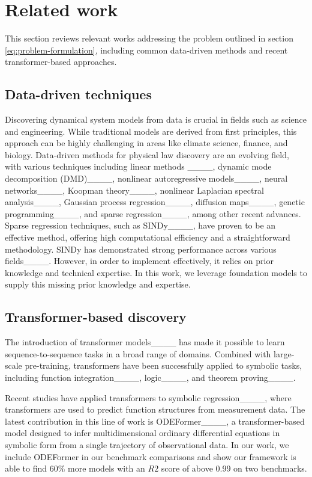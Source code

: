 \section{Related work}
This section reviews relevant works addressing the problem outlined in section \ref{eq:problem-formulation}, including common data-driven methods and recent transformer-based approaches.

\subsection{Data-driven techniques}

Discovering dynamical system models from data is crucial in fields such as science and engineering.
While traditional models are derived from first principles, this approach can be highly challenging in areas like climate science, finance, and biology. 
Data-driven methods for physical law discovery are an evolving field, 
with various techniques including
linear methods ____, 
dynamic mode decomposition (DMD)____, 
nonlinear autoregressive models____, 
neural networks____, 
Koopman theory____,
nonlinear Laplacian spectral analysis____, 
Gaussian process regression____, 
diffusion maps____, 
genetic programming____, and 
sparse regression____, among other recent advances.
Sparse regression techniques, such as SINDy____, have proven to be an effective method, offering high computational efficiency and a straightforward methodology. 
SINDy has demonstrated strong performance across various fields____. 
However, in order to implement effectively, it relies on prior knowledge and technical expertise. 
In this work, we leverage foundation models to supply this missing prior knowledge and expertise.

\subsection{Transformer-based discovery}

The introduction of transformer models____ has made it possible to learn sequence-to-sequence tasks in a broad range of domains. 
Combined with large-scale pre-training, transformers have been successfully applied to symbolic tasks, including 
function integration____, 
logic____, and theorem proving____.

Recent studies have applied transformers to symbolic regression____, where transformers are used to predict function structures from measurement data. 
The latest contribution in this line of work is ODEFormer____, a transformer-based model designed to infer multidimensional ordinary differential equations in symbolic form from a single trajectory of observational data. 
In our work, we include ODEFormer in our benchmark comparisons and show our framework is able to find $60\%$ more models with an $R2$ score of above 0.99 on two benchmarks.

